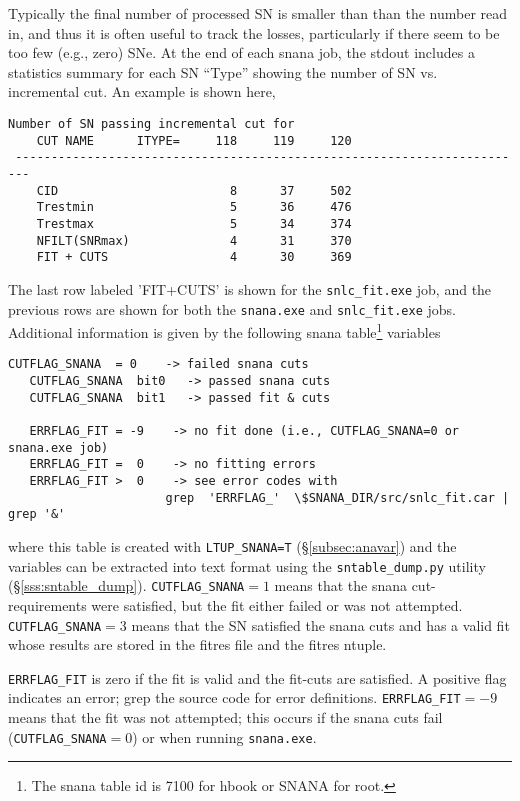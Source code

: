 \documentclass[12pt]{article}
\begin{document}
Typically the final number of processed SN
is smaller than than the number read in,
and thus it is often useful to track the losses,
particularly if there seem to be too few (e.g., zero)
SNe. At the end of each snana job, the stdout includes
a statistics summary for each SN ``Type'' showing
the number of SN vs. incremental cut. An example 
is shown here,
%
\begin{Verbatim}[frame=single] 
                          Number of SN passing incremental cut for
    CUT NAME      ITYPE=     118     119     120  
 ------------------------------------------------------------------------
    CID                        8      37     502  
    Trestmin                   5      36     476  
    Trestmax                   5      34     374  
    NFILT(SNRmax)              4      31     370  
    FIT + CUTS                 4      30     369  
\end{Verbatim}
%
The last row labeled 'FIT+CUTS' is shown 
for the {\tt snlc\_fit.exe} job,
and the previous rows are shown for both the
{\tt snana.exe} and {\tt snlc\_fit.exe} jobs.
Additional information is given by the following
snana table\footnote{The snana table id is 7100 for hbook or SNANA for root.}
variables
\begin{Verbatim}[frame=single] 
   CUTFLAG_SNANA  = 0    -> failed snana cuts
   CUTFLAG_SNANA  bit0   -> passed snana cuts
   CUTFLAG_SNANA  bit1   -> passed fit & cuts

   ERRFLAG_FIT = -9    -> no fit done (i.e., CUTFLAG_SNANA=0 or snana.exe job)
   ERRFLAG_FIT =  0    -> no fitting errors
   ERRFLAG_FIT >  0    -> see error codes with
                      grep  'ERRFLAG_'  \$SNANA_DIR/src/snlc_fit.car | grep '&'
\end{Verbatim}
%
where this table is created with {\tt LTUP\_SNANA=T}
(\S\ref{subsec:anavar}) and the variables can be
extracted into text format using the {\tt sntable\_dump.py}
utility (\S\ref{sss:sntable_dump}).
{\tt CUTFLAG\_SNANA}$=1$ means that the snana cut-requirements
were satisfied, but the fit either failed or was not attempted.
{\tt CUTFLAG\_SNANA}$=3$ means that the SN satisfied the snana cuts
and has a valid fit whose results are stored in the fitres file
and the fitres ntuple.

{\tt ERRFLAG\_FIT} is zero if the fit is valid and the
fit-cuts are satisfied. A positive flag indicates an
error; grep the source code for error definitions.
{\tt ERRFLAG\_FIT}$=-9$ means that the fit was not
attempted; this occurs if the snana cuts fail
({\tt CUTFLAG\_SNANA}$=0$) or when running {\tt snana.exe}.
\end{document}
